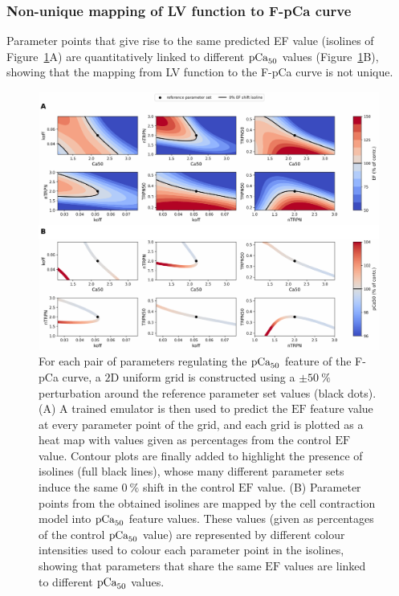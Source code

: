 %
%
%
\subsubsection{Non-unique mapping of LV function to F-pCa curve}\label{sec:lvtofpcanonuniquemapping}
Parameter points that give rise to the same predicted EF value (isolines of Figure~\ref{fig:EFisolines}A) are quantitatively linked to different $\textrm{pCa}_{50}$ values (Figure~\ref{fig:EFisolines}B), showing that the mapping from LV function to the F-pCa curve is not unique.

\begin{figure}[h!]
    \myfloatalign
    \includegraphics[width=\textwidth]{figures/chapter08/Fig6.pdf}
    \caption{For each pair of parameters regulating the $\textrm{pCa}_{50}$ feature of the F-pCa curve, a $2$D uniform grid is constructed using a $\pm\SI{50}{\percent}$ perturbation around the reference parameter set values (black dots). (A) A trained emulator is then used to predict the $\textrm{EF}$ feature value at every parameter point of the grid, and each grid is plotted as a heat map with values given as percentages from the control $\textrm{EF}$ value. Contour plots are finally added to highlight the presence of isolines (full black lines), whose many different parameter sets induce the same $\SI{0}{\percent}$ shift in the control $\textrm{EF}$ value. (B) Parameter points from the obtained isolines are mapped by the cell contraction model into $\textrm{pCa}_{50}$ feature values. These values (given as percentages of the control $\textrm{pCa}_{50}$ value) are represented by different colour intensities used to colour each parameter point in the isolines, showing that parameters that share the same $\textrm{EF}$ values are linked to different $\textrm{pCa}_{50}$ values.}
    \label{fig:EFisolines}
\end{figure}


